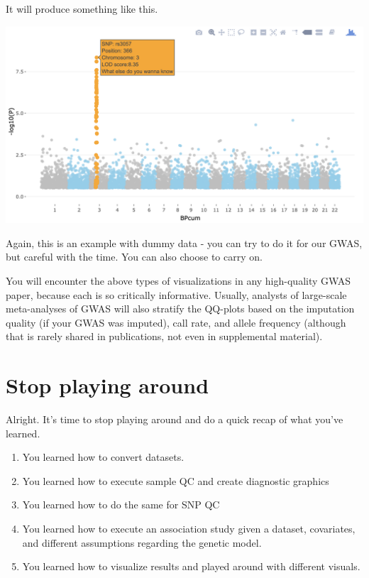 \documentclass[
]{book}
\providecommand{\tightlist}{%
  \setlength{\itemsep}{0pt}\setlength{\parskip}{0pt}}
\begin{document}
It will produce something like this.

\includegraphics{img/_gwas/interactive plot.png}

Again, this is an example with dummy data - you can try to do it for our GWAS, but careful with the time. You can also choose to carry on.

You will encounter the above types of visualizations in any high-quality GWAS paper, because each is so critically informative. Usually, analysts of large-scale meta-analyses of GWAS will also stratify the QQ-plots based on the imputation quality (if your GWAS was imputed), call rate, and allele frequency (although that is rarely shared in publications, not even in supplemental material).

\hypertarget{stop-playing-around}{%
\section{Stop playing around}\label{stop-playing-around}}

Alright. It's time to stop playing around and do a quick recap of what you've learned.

\begin{enumerate}
\def\labelenumi{\arabic{enumi}.}
\tightlist
\item
  You learned how to convert datasets.
\item
  You learned how to execute sample QC and create diagnostic graphics
\item
  You learned how to do the same for SNP QC
\item
  You learned how to execute an association study given a dataset, covariates, and different assumptions regarding the genetic model.
\item
  You learned how to visualize results and played around with different visuals.
\end{enumerate}
\end{document}
